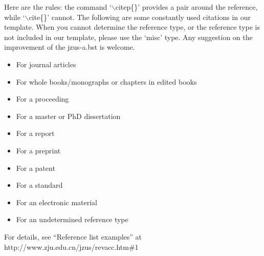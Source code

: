 \documentclass[twoside,twocolumn]{article}
\begin{document}
Here are the rules: the command `$\backslash$citep\{\}' provides a pair
around the reference, while `$\backslash$cite\{\}' cannot. The
following are some constantly used citations in our template. When
you cannot determine the reference type, or the reference type is
not included in our template, please use the `misc' type. Any
suggestion on the improvement of the jzus-a.bst is welcome.
\begin{itemize}
\itemsep -1pt
\item For journal articles \citep{Kampf02, TWFS03, Yu10}
\item For whole books/monographs or chapters in edited books \citep{Prigogine76}
\item For a proceeding \citep{GQMPSD06}
\item For a master or PhD dissertation \citep{Rizvi06}
\item For a report \citep{Sweeney00}
\item For a preprint \citep{WAWYCZM08}
\item For a patent \citep{Cookson85}
\item For a standard \citep{ISO82}
\item For an electronic material \citep{Sheffield01}
\item For an undetermined reference type \citep{misc10}
\end{itemize}

For details, see ``Reference list examples'' at http://www.zju.edu.cn/jzus/revacc.htm\#1

\balance



\end{document}
